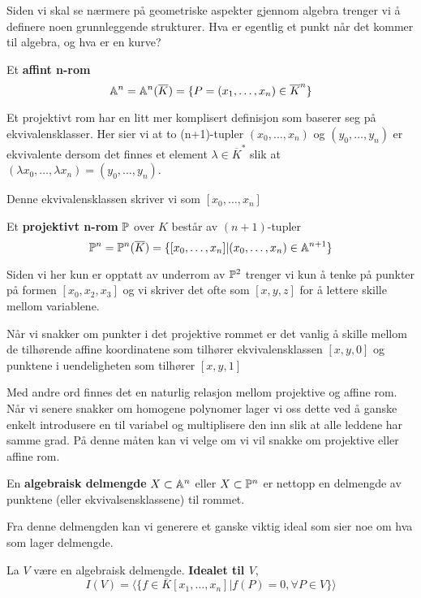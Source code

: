 Siden vi skal se nærmere på geometriske aspekter gjennom algebra trenger vi å definere noen grunnleggende strukturer. Hva er egentlig et punkt når det kommer til algebra, og hva er en kurve?

\begin{definisjon}
Et \textbf{affint n-rom} $$ \mathbb{A} ^n = \mathbb{A}^n(\overline{K}) = \{P = (x_1, \ldots, x_n ) \in \overline{K}^n \}$$
\end{definisjon}

Et projektivt rom har en litt mer komplisert definisjon som baserer seg på ekvivalensklasser. Her sier vi at to (n+1)-tupler $(x_0, \ldots, x_n)$ og $(y_0, \ldots, y_n)$ er ekvivalente dersom det finnes et element $\lambda \in \overline{K}^*$ slik at $(\lambda x_0, \ldots, \lambda x_n) = (y_0, \ldots, y_n)$.

Denne ekvivalensklassen skriver vi som $[x_0, \ldots, x_n]$
\begin{definisjon}
    Et \textbf{projektivt n-rom} $\mathbb{P}$ over $K$ består av $(n+1)$-tupler $$\mathbb{P}^n = \mathbb{P}^n(\overline{K}) = \{[x_0, \ldots, x_n] | (x_0, \ldots, x_n) \in \mathbb{A} ^{n+1}\}$$
\end{definisjon}

Siden vi her kun er opptatt av underrom av $\mathbb{P}^2$ trenger vi kun å tenke på punkter på formen $[x_0, x_2, x_3]$ og vi skriver det ofte som $[x, y, z]$ for å lettere skille mellom variablene.

Når vi snakker om punkter i det projektive rommet er det vanlig å skille mellom de tilhørende affine koordinatene som tilhører ekvivalensklassen $[x, y, 0]$ og punktene i uendeligheten som tilhører $[x, y, 1]$

Med andre ord finnes det en naturlig relasjon mellom projektive og affine rom. Når vi senere snakker om homogene polynomer lager vi oss dette ved å ganske enkelt introdusere en til variabel og multiplisere den inn slik at alle leddene har samme grad. På denne måten kan vi velge om vi vil snakke om projektive eller affine rom.

\begin{definisjon}
En \textbf{algebraisk delmengde} $X \subset \mathbb{A}^n$ eller $X \subset \mathbb{P}^n$ er nettopp en delmengde av punktene (eller ekvivalsensklassene) til rommet.
\end{definisjon}
Fra denne delmengden kan vi generere et ganske viktig ideal som sier noe om hva som lager delmengde. 
\begin{definisjon}
    La $V$ være en algebraisk delmengde. \textbf{Idealet til $V$}, $$I(V) = \langle \{f \in \overline{K}[x_1, \ldots, x_n] | f(P) = 0, \forall P \in V \} \rangle$$
\end{definisjon}

